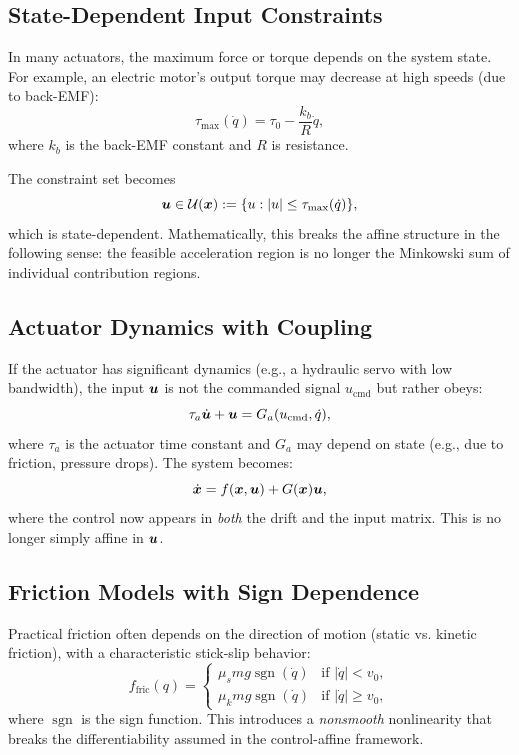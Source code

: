 \subsection{State-Dependent Input Constraints}

In many actuators, the maximum force or torque depends on the system state. For example, an
electric motor's output torque may decrease at high speeds (due to back-EMF):
\begin{equation}
\tau_{\max}(\dot q) = \tau_0 - \frac{k_b}{R}\dot q,
\label{eq:ch3:motor-saturation}
\end{equation}
where $k_b$ is the back-EMF constant and $R$ is resistance.

The constraint set becomes
\begin{equation}
\bm{u} \in \mathcal{U}(\bm{x}) := \{ u : |u| \leq \tau_{\max}(\dot q) \},
\label{eq:ch3:state-dependent-constraints}
\end{equation}
which is state-dependent. Mathematically, this breaks the affine structure in the following
sense: the feasible acceleration region is no longer the Minkowski sum of individual
contribution regions.

\subsection{Actuator Dynamics with Coupling}

If the actuator has significant dynamics (e.g., a hydraulic servo with low bandwidth), the
input $\bm{u}$ is not the commanded signal $u_{\text{cmd}}$ but rather obeys:
\begin{equation}
\tau_a \dot{\bm{u}} + \bm{u} = G_a(u_{\text{cmd}}, \dot q),
\label{eq:ch3:actuator-dynamics}
\end{equation}
where $\tau_a$ is the actuator time constant and $G_a$ may depend on state (e.g., due to
friction, pressure drops). The system becomes:
\begin{equation}
\dot{\bm{x}} = f(\bm{x},\bm{u}) + G(\bm{x})\bm{u},
\label{eq:ch3:actuator-coupled}
\end{equation}
where the control now appears in \emph{both} the drift and the input matrix. This is no longer
simply affine in $\bm{u}$.

\subsection{Friction Models with Sign Dependence}

Practical friction often depends on the direction of motion (static vs. kinetic friction), with
a characteristic stick-slip behavior:
\begin{equation}
f_{\text{fric}}(q) = \begin{cases}
\mu_s mg \operatorname{sgn}(\dot q) & \text{if } |\dot q| < v_0, \\
\mu_k mg \operatorname{sgn}(\dot q) & \text{if } |\dot q| \geq v_0,
\end{cases}
\label{eq:ch3:friction-nonsmooth}
\end{equation}
where $\operatorname{sgn}$ is the sign function. This introduces a \emph{nonsmooth} nonlinearity that
breaks the differentiability assumed in the control-affine framework.

